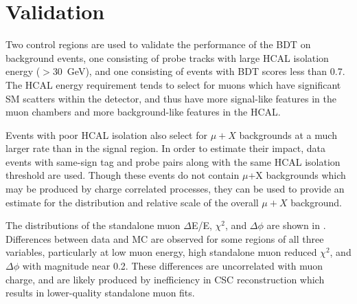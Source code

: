 \section{Validation}
\label{sec:BDTvalid}
Two control regions are used to validate the performance of the BDT on background events, one consisting of probe tracks with large HCAL isolation energy ($>$\SI{30}{\giga\eV}), and one consisting of events with BDT scores less than 0.7. 
The HCAL energy requirement tends to select for muons which have significant SM scatters within the detector, and thus have more signal-like features in the muon chambers and more background-like features in the HCAL.

Events with poor HCAL isolation also select for $\mu+X$ backgrounds at a much larger rate than in the signal region.
In order to estimate their impact, data events with same-sign tag and probe pairs along with the same HCAL isolation threshold are used.
Though these events do not contain $\mu$+X backgrounds which may be produced by charge correlated processes, they can be used to provide an estimate for the distribution and relative scale of the overall $\mu+X$ background.

The distributions of the standalone muon $\Delta$E/E, $\chi^{2}$, and $\Delta\phi$ are shown in . 
Differences between data and MC are observed for some regions of all three variables, particularly at low muon energy, high standalone muon reduced $\chi^{2}$, and $\Delta\phi$ with magnitude near 0.2. 
These differences are uncorrelated with muon charge, and are likely produced by inefficiency in CSC reconstruction which results in lower-quality standalone muon fits.

